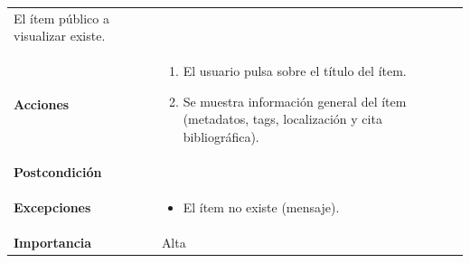 \documentclass[
]{article}
\providecommand{\tightlist}{%
  \setlength{\itemsep}{0pt}\setlength{\parskip}{0pt}}
\begin{document}
\begin{longtable}[]{@{}ll@{}}
\begin{minipage}[t]{0.74\columnwidth}
El ítem público a visualizar existe.\strut
\end{minipage}\tabularnewline
\begin{minipage}[t]{0.20\columnwidth}\raggedright
\textbf{Acciones}\strut
\end{minipage} & \begin{minipage}[t]{0.74\columnwidth}\raggedright
\begin{enumerate}
\def\labelenumi{\arabic{enumi}.}
\tightlist
\item
  El usuario pulsa sobre el título del ítem.
\item
  Se muestra información general del ítem (metadatos, tags, localización
  y cita bibliográfica).
\end{enumerate}\strut
\end{minipage}\tabularnewline
\begin{minipage}[t]{0.20\columnwidth}\raggedright
\textbf{Postcondición}\strut
\end{minipage} & \begin{minipage}[t]{0.74\columnwidth}\raggedright
\strut
\end{minipage}\tabularnewline
\begin{minipage}[t]{0.20\columnwidth}\raggedright
\textbf{Excepciones}\strut
\end{minipage} & \begin{minipage}[t]{0.74\columnwidth}\raggedright
\begin{itemize}
\tightlist
\item
  El ítem no existe (mensaje).
\end{itemize}\strut
\end{minipage}\tabularnewline
\begin{minipage}[t]{0.20\columnwidth}\raggedright
\textbf{Importancia}\strut
\end{minipage} & \begin{minipage}[t]{0.74\columnwidth}\raggedright
Alta\strut
\end{minipage}\tabularnewline
\bottomrule
\end{longtable}
\end{document}
